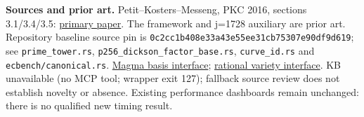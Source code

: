 \documentclass[10pt,a4paper]{article}
\begin{document}
\textbf{Sources and prior art.}
Petit--Kosters--Messeng, PKC 2016, sections 3.1/3.4/3.5:
\href{https://people.maths.ox.ac.uk/petit/files/16PKC_primeECDLP.pdf}{primary paper}.
The framework and j=1728 auxiliary are prior art. Repository baseline source
pin is \texttt{0c2cc1b408e33a43e55ee31cb75307e90df9d619}; see
\texttt{prime\_tower.rs}, \texttt{p256\_dickson\_factor\_base.rs},
\texttt{curve\_id.rs} and \texttt{ecbench/canonical.rs}.
\href{https://magma.maths.usyd.edu.au/magma/handbook/text/1314}{Magma basis interface};
\href{https://magma.maths.usyd.edu.au/magma/handbook/text/1325}{rational variety interface}.
KB unavailable (no MCP tool; wrapper exit 127); fallback source review
does not establish novelty or absence. Existing performance dashboards
remain unchanged: there is no qualified new timing result.
\end{document}
